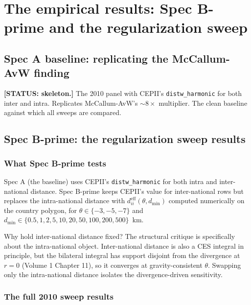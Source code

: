 \documentclass[11pt,letterpaper,oneside]{book}
\theoremstyle{definition}
\theoremstyle{remark}
\newcommand{\eff}{\mathrm{eff}}
\begin{document}
\part{The empirical results: Spec B-prime and the regularization sweep}

\chapter{Spec A baseline: replicating the McCallum-AvW finding}

\textbf{[STATUS: skeleton.]} The 2010 panel with CEPII's
\texttt{distw\_harmonic} for both inter and intra. Replicates
McCallum-AvW's $\sim 8\times$ multiplier. The clean baseline against
which all sweeps are compared.

\chapter{Spec B-prime: the regularization sweep results}
\label{ch:bprime}

\section{What Spec B-prime tests}

Spec A (the baseline) uses CEPII's \texttt{distw\_harmonic} for both
intra and inter-national distance. Spec B-prime keeps CEPII's value
for inter-national rows but replaces the intra-national distance with
$d_{ii}^{\eff}(\theta, d_{\min})$ computed numerically on the country
polygon, for $\theta \in \{-3, -5, -7\}$ and
$d_{\min} \in \{0.5, 1, 2, 5, 10, 20, 50, 100, 200, 500\}$~km.

Why hold inter-national distance fixed? The structural critique is
specifically about the intra-national object. Inter-national distance
is also a CES integral in principle, but the bilateral integral has
support disjoint from the divergence at $r = 0$ (Volume 1 Chapter 11),
so it converges at gravity-consistent $\theta$. Swapping only the
intra-national distance isolates the divergence-driven sensitivity.

\section{The full 2010 sweep results}
\end{document}
